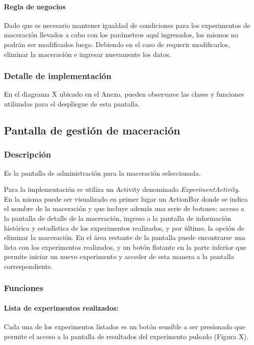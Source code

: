                 \paragraph{Regla de negocios}
                Dado que es necesario mantener igualdad de condiciones para los experimentos de maceración llevados a cabo con los parámetros aquí ingresados, los mismos no podrán ser modificados luego. Debiendo en el caso de requerir modificarlos, eliminar la maceración e ingresar nuevamente los datos.
            
            \subsubsection{Detalle de implementación}
                En el diagrama X ubicado en el Anexo, pueden observarse las clases y funciones utilizadas para el despliegue de esta pantalla.
        
        \subsection{Pantalla de gestión de maceración}
            \subsubsection{Descripción}
                \par Es la pantalla de administración para la maceración seleccionada.
                \par Para la implementación se utiliza un Activity denominado \textit{ExperimentActivity}. En la misma puede ser visualizado en primer lugar un ActionBar donde se indica el nombre de la maceración y que incluye además una serie de botones: acceso a la pantalla de detalle de la maceración, ingreso a la pantalla de información histórica y estadística de los experimentos realizados, y por último, la opción de eliminar la maceración. En el área restante de la pantalla puede encontrarse una lista con los experimentos realizados, y un botón flotante en la parte inferior que permite iniciar un nuevo experimento y acceder de esta manera a la pantalla correspondiente.
                
                
            \subsubsection{Funciones}
                \paragraph{Lista de experimentos realizados:}
                Cada una de los experimentos listados es un botón sensible a ser presionado que permite el acceso a la pantalla de resultados del experimento pulsado (Figura X).
                
